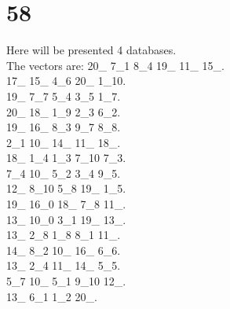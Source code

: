 \chapter{58}
\indent Here will be presented 4 databases.\\
The vectors are:
20\_ 7\_1 8\_4 19\_ 11\_ 15\_.\\17\_ 15\_ 4\_6 20\_ 1\_10.\\19\_ 7\_7 5\_4 3\_5 1\_7.\\20\_ 18\_ 1\_9 2\_3 6\_2.\\19\_ 16\_ 8\_3 9\_7 8\_8.\\2\_1 10\_ 14\_ 11\_ 18\_.\\18\_ 1\_4 1\_3 7\_10 7\_3.\\7\_4 10\_ 5\_2 3\_4 9\_5.\\12\_ 8\_10 5\_8 19\_ 1\_5.\\19\_ 16\_0 18\_ 7\_8 11\_.\\13\_ 10\_0 3\_1 19\_ 13\_.\\13\_ 2\_8 1\_8 8\_1 11\_.\\14\_ 8\_2 10\_ 16\_ 6\_6.\\13\_ 2\_4 11\_ 14\_ 5\_5.\\5\_7 10\_ 5\_1 9\_10 12\_.\\13\_ 6\_1 1\_2 20\_.\\